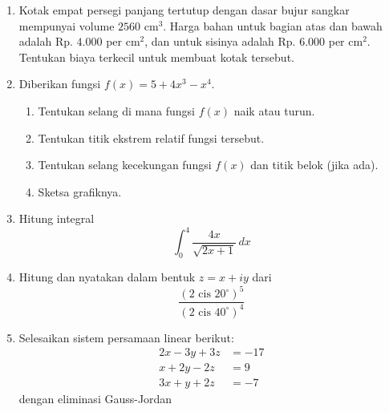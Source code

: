 \documentclass[11pt,a4paper]{article}
\begin{document}
    \begin{enumerate}
	\item Kotak empat persegi panjang tertutup dengan dasar bujur sangkar mempunyai volume \(2560 \text{ cm}^3\).  
  Harga bahan untuk bagian atas dan bawah adalah Rp. \(4.000\) per \(\text{cm}^2\), dan untuk sisinya adalah Rp. \(6.000\) per \(\text{cm}^2\).  
  Tentukan biaya terkecil untuk membuat kotak tersebut.  

        \item Diberikan fungsi \( f(x) = 5 + 4x^3 - x^4 \).  
        \begin{enumerate}
            \item Tentukan selang di mana fungsi \( f(x) \) naik atau turun.
            \item Tentukan titik ekstrem relatif fungsi tersebut.
            \item Tentukan selang kecekungan fungsi \( f(x) \) dan titik belok (jika ada).
            \item Sketsa grafiknya.
        \end{enumerate}

        \item Hitung integral  
        \[
        \int_{0}^{4} \frac{4x}{\sqrt{2x+1}} \, dx
        \]
        
        \item Hitung dan nyatakan dalam bentuk \( z = x + iy \) dari  
        \[
        \frac{(2 \text{ cis } 20^\circ)^5}{(2 \text{ cis } 40^\circ)^4}
        \]

        \item Selesaikan sistem persamaan linear berikut:  
        \[
        \begin{aligned}
            2x - 3y + 3z &= -17 \\
            x + 2y - 2z &= 9 \\
            3x + y + 2z &= -7
        \end{aligned}
        \]
        dengan eliminasi Gauss-Jordan
    \end{enumerate}
	

\end{document}
